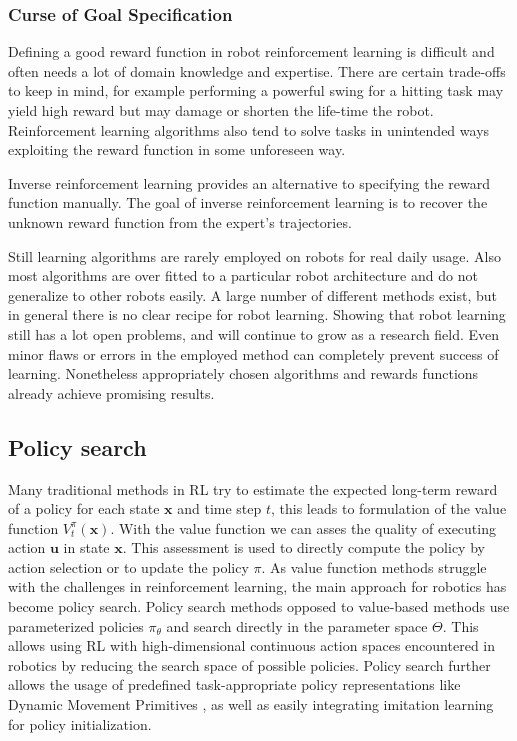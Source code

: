 \subsubsection{Curse of Goal Specification}
Defining a good reward function in robot reinforcement learning is
difficult and often needs a lot of domain knowledge and expertise.
There are certain trade-offs to keep in mind, for example performing
a powerful swing for a hitting task may yield high reward but may damage
or shorten the life-time the robot.
Reinforcement learning algorithms also tend to solve tasks
in unintended ways exploiting the reward function in some unforeseen way.

Inverse reinforcement learning \citet{russell1998learning}
provides an alternative  to specifying the reward function manually.
The goal of inverse reinforcement learning is to recover the unknown
reward function from the expert's trajectories.

Still learning algorithms are rarely employed on robots
for real daily usage. Also most
algorithms are over fitted to a particular robot architecture
and do not generalize to other robots easily.
A large number of different methods exist, but
in general there is no clear recipe for robot learning.
Showing that robot learning still has a lot open problems,
and will continue to grow as a research field.
Even minor flaws or errors in the employed method can completely prevent
success of learning.
Nonetheless appropriately chosen algorithms and rewards functions
already achieve promising results.


\subsection{Policy search}
Many traditional methods in RL try to estimate the
expected long-term reward of a policy for each state $\mathbf{x}$
and time step $t$, this leads to formulation of the value function $V^{\pi}_t(\mathbf{x})$.
With the value function we can asses the quality of executing action
$\mathbf{u}$ in state $\mathbf{x}$. This assessment is used
to directly compute the policy by action selection or to update
the policy $\pi$. As value function methods struggle with the
challenges in reinforcement learning, the main approach
for robotics has become policy search.
Policy search methods opposed to value-based methods
use parameterized policies $\pi_{\theta}$ and search
directly in the parameter space $\Theta$. This allows using RL with
high-dimensional continuous action spaces encountered
in robotics by reducing the search space of possible policies.
Policy search further allows the usage of predefined
task-appropriate policy representations like Dynamic
Movement Primitives \citet{schaal2005learning}, as well
as easily integrating imitation learning
for policy initialization.

